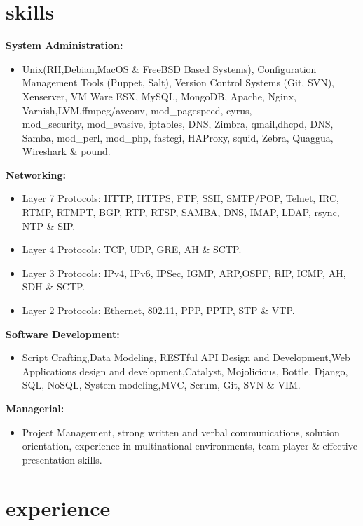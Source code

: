 \documentclass[]{friggeri-cv} %
\begin{document}
\section{skills}
{\large \textbf{System Administration:}}
\begin{itemize}
\item Unix(RH,Debian,MacOS \& FreeBSD Based Systems), Configuration Management Tools (Puppet, Salt), Version Control Systems (Git, SVN), Xenserver, VM Ware ESX, MySQL, MongoDB, Apache, Nginx, Varnish,LVM,ffmpeg/avconv, mod\_pagespeed, cyrus, \\ 
mod\_security, mod\_evasive, iptables, DNS, Zimbra, qmail,dhcpd, DNS, Samba, mod\_perl, mod\_php, fastcgi, HAProxy, squid, Zebra, Quaggua, Wireshark \& pound.  
\end{itemize}
{\large \textbf{Networking:}}
\begin{itemize}
\item Layer 7 Protocols: HTTP, HTTPS, FTP, SSH, SMTP/POP, Telnet, IRC, RTMP, RTMPT, BGP, RTP, RTSP, SAMBA, DNS, IMAP, LDAP, rsync, NTP \& SIP. 
\item Layer 4 Protocols: TCP, UDP, GRE, AH \& SCTP.
\item Layer 3 Protocols: IPv4, IPv6, IPSec, IGMP, ARP,OSPF, RIP, ICMP, AH, SDH \& SCTP.
\item Layer 2 Protocols: Ethernet, 802.11, PPP, PPTP, STP \& VTP.
\end{itemize}
{\large \textbf{Software Development:}}
\begin{itemize}
\item Script Crafting,Data Modeling, RESTful API Design and Development,Web Applications design and development,Catalyst, Mojolicious, Bottle, Django, SQL, NoSQL, System modeling,MVC, Scrum, Git, SVN \& VIM.
\end{itemize}
{\large \textbf{Managerial:}}
\begin{itemize}
\item Project Management, strong written and verbal communications, solution orientation, experience in multinational environments, team player  \& effective presentation skills. 
\end{itemize}
\section{experience}
\end{document}
